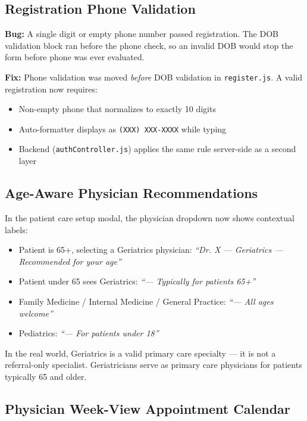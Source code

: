 \documentclass[12pt, letterpaper]{article}
\begin{document}
\subsection{Registration Phone Validation}

\textbf{Bug:} A single digit or empty phone number passed registration. The DOB validation block ran before the phone check, so an invalid DOB would stop the form before phone was ever evaluated.

\textbf{Fix:} Phone validation was moved \textit{before} DOB validation in \texttt{register.js}. A valid registration now requires:
\begin{itemize}
  \item Non-empty phone that normalizes to exactly 10 digits
  \item Auto-formatter displays as \texttt{(XXX) XXX-XXXX} while typing
  \item Backend (\texttt{authController.js}) applies the same rule server-side as a second layer
\end{itemize}

\subsection{Age-Aware Physician Recommendations}

In the patient care setup modal, the physician dropdown now shows contextual labels:
\begin{itemize}
  \item Patient is 65+, selecting a Geriatrics physician: \textit{``Dr. X — Geriatrics — Recommended for your age''}
  \item Patient under 65 sees Geriatrics: \textit{``--- Typically for patients 65+''}
  \item Family Medicine / Internal Medicine / General Practice: \textit{``--- All ages welcome''}
  \item Pediatrics: \textit{``--- For patients under 18''}
\end{itemize}

In the real world, Geriatrics is a valid primary care specialty — it is not a referral-only specialist. Geriatricians serve as primary care physicians for patients typically 65 and older.

\subsection{Physician Week-View Appointment Calendar}
\end{document}
